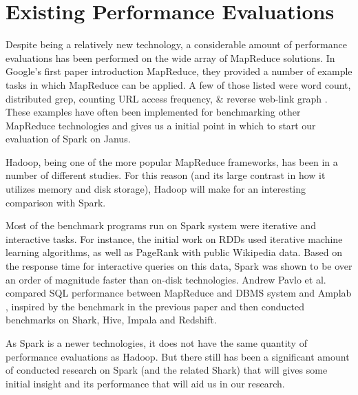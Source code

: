 \documentclass{article}
\begin{document}


\section*{Existing Performance Evaluations }
Despite being a relatively new technology, a considerable amount of performance
evaluations has been performed on the wide array of MapReduce solutions.
In Google's first paper introduction MapReduce, they provided a number of
example tasks in which MapReduce can be applied. A few of those listed were
word count, distributed grep, counting URL access frequency, \& reverse web-link
graph \citep{dean-mapreduce}. These examples have often been implemented for
benchmarking other MapReduce technologies and gives us a initial point in which
to start our evaluation of Spark on Janus.

Hadoop, being one of the more popular MapReduce frameworks, has been in a
number of different studies. For this reason (and its large contrast in how
it utilizes memory and disk storage), Hadoop will make for an interesting
comparison with Spark.

Most of the benchmark programs run on Spark system were iterative and
interactive tasks. For instance, the initial work on RDDs \citep{zaharia_rdd}
used iterative machine learning algorithms, as well as PageRank with public
Wikipedia data. Based on the response time for interactive queries on
this data, Spark was shown to be over an order of magnitude faster than
on-disk technologies.
Andrew Pavlo et al. \cite{andrew} compared SQL performance between
MapReduce and DBMS system and Amplab \citep{amplab_bench}, inspired by the
benchmark in the previous paper and then conducted benchmarks on Shark,
Hive\citep{ashish}, Impala and Redshift.


As Spark is a newer technologies, it does not have the same quantity of
performance evaluations as Hadoop. But there still has been a significant
amount of conducted research on Spark (and the related Shark) that will gives
some initial insight and its performance that will aid us in our research.

\end{document}
